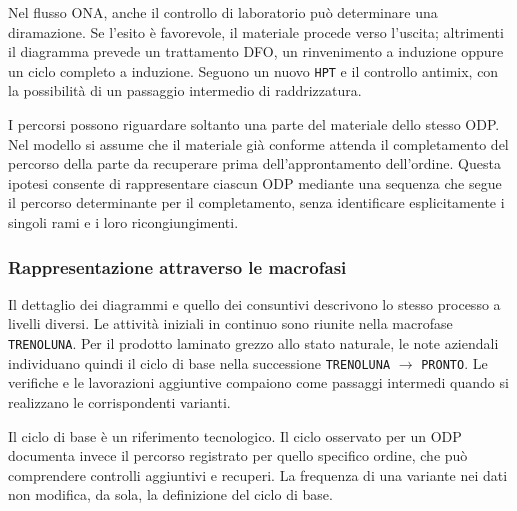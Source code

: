 Nel flusso ONA, anche il controllo di laboratorio può determinare una diramazione. Se l'esito è favorevole, il materiale procede verso l'uscita; altrimenti il diagramma prevede un trattamento DFO, un rinvenimento a induzione oppure un ciclo completo a induzione. Seguono un nuovo \texttt{HPT} e il controllo antimix, con la possibilità di un passaggio intermedio di raddrizzatura.

I percorsi possono riguardare soltanto una parte del materiale dello stesso ODP. Nel modello si assume che il materiale già conforme attenda il completamento del percorso della parte da recuperare prima dell'approntamento dell'ordine. Questa ipotesi consente di rappresentare ciascun ODP mediante una sequenza che segue il percorso determinante per il completamento, senza identificare esplicitamente i singoli rami e i loro ricongiungimenti.

\subsubsection{Rappresentazione attraverso le macrofasi}

Il dettaglio dei diagrammi e quello dei consuntivi descrivono lo stesso processo a livelli diversi. Le attività iniziali in continuo sono riunite nella macrofase \texttt{TRENOLUNA}. Per il prodotto laminato grezzo allo stato naturale, le note aziendali individuano quindi il ciclo di base nella successione \texttt{TRENOLUNA} $\rightarrow$ \texttt{PRONTO}. Le verifiche e le lavorazioni aggiuntive compaiono come passaggi intermedi quando si realizzano le corrispondenti varianti.

Il ciclo di base è un riferimento tecnologico. Il ciclo osservato per un ODP documenta invece il percorso registrato per quello specifico ordine, che può comprendere controlli aggiuntivi e recuperi. La frequenza di una variante nei dati non modifica, da sola, la definizione del ciclo di base.

